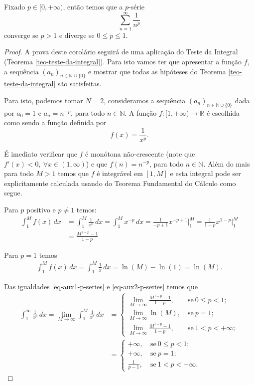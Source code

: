 



\begin{corolario}\label{cor-crit-conv-p-series}
Fixado $p\in [0,+\infty)$, então temos que a $p$-série 
\[
\sum_{n=1}^{\infty} \frac{1}{n^p}
\] 
converge se $p>1$ e diverge se $0\leqslant p\leqslant 1$.
\end{corolario}

\begin{proof}
A prova deste corolário seguirá de uma aplicação do Teste da Integral
(Teorema \ref{teo-teste-da-integral}). Para isto vamos ter que apresentar 
a função $f$, a sequência $(a_n)_{n\in\mathbb{N}\cup\{0\}}$ e 
mostrar que todas as hipóteses do Teorema \ref{teo-teste-da-integral}
são satisfeitas. 

\medskip 
Para isto, podemos tomar $N=2$,
consideramos a sequência $(a_n)_{n\in\mathbb{N}\cup\{0\}}$ dada por $a_0=1$ e 
$a_n=n^{-p}$, para todo $n\in\mathbb{N}$. A função $f:[1,+\infty)\to\mathbb{R}$ 
é escolhida como sendo a função definida por
\[
f(x) = \frac{1}{x^p}.
\]

É imediato verificar que $f$ é monótona não-crescente (note que
$f'(x)<0,\ \forall x\in(1,\infty)$) e que $f(n) = n^{-p}$, para todo $n\in\mathbb{N}$.
Além do mais para todo $M>1$ temos que $f$ é integrável em $[1,M]$ e 
esta integral pode ser explicitamente calculada usando do Teorema Fundamental do Cálculo
como segue. 

Para $p$ positivo e  $p\neq 1$ temos:
\begin{align}\label{eq-aux1-p-series}
\int_{1}^{M}f(x)\, dx
&=
\int_{1}^{M}\frac{1}{x^p}\, dx
=
\int_{1}^{M}x^{-p}\, dx
=
\frac{1}{-p+1} x^{-p+1}\Big|_{1}^{M}
=
\frac{1}{1-p} x^{1-p}\Big|_{1}^{M}
\nonumber
\\[0.3cm]
&=
\frac{M^{1-p}-1}{1-p}
\end{align}

Para $p=1$ temos 
\begin{align}\label{eq-aux2-p-series}
\int_{1}^{M}f(x)\, dx
=
\int_{1}^{M}\frac{1}{x}\, dx
=
\ln(M)-\ln(1)= \ln(M).
\end{align}


Das igualdades \eqref{eq-aux1-p-series} e \eqref{eq-aux2-p-series}
temos que
\begin{align*}
\int_{1}^{\infty} \frac{1}{x^p}\, dx
=
\lim_{M\to\infty} \int_{1}^{M} \frac{1}{x^p}\, dx
&=
\begin{cases}
\displaystyle
\lim_{M\to\infty} \frac{M^{1-p}-1}{1-p},&\ \text{se}\ 0\leqslant p<1;
\\[0.5cm]
\displaystyle
\lim_{M\to\infty} \ln(M),&\ \text{se}\  p=1;
\\[0.5cm]
\displaystyle
\lim_{M\to\infty} \frac{M^{1-p}-1}{1-p},&\ \text{se}\ 1< p<+\infty;
\end{cases}
\\[0.5cm]
&=
\begin{cases}
\displaystyle
+\infty,&\ \text{se}\ 0\leqslant p<1;
\\[0.2cm]
\displaystyle
+\infty,&\ \text{se}\  p=1;
\\[0.2cm]
\displaystyle
\frac{1}{p-1},&\ \text{se}\ 1< p<+\infty.
\end{cases}
\end{align*}


\end{proof}
